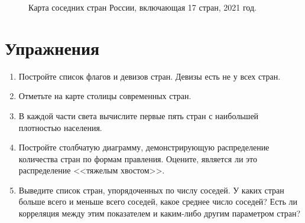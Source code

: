 \begin{figure*}[h]
	{
		\setlength{\fboxsep}{0pt}%
		\setlength{\fboxrule}{1pt}%
	}
    \caption[Карта соседних стран России, 2021 год.]{Карта соседних стран России, включающая 17 стран, 2021 год.}
	\label{fig:neighboring_countries_ru_2020}%
\end{figure*}


\section{Упражнения}

\begin{enumerate}
	\item Постройте список флагов и девизов стран. Девизы есть не у всех стран.
	\item Отметьте на карте столицы современных стран.
	\item В каждой части света вычислите первые пять стран с наибольшей плотностью населения.
	\item Постройте столбчатую диаграмму, демонстрирующую распределение количества стран по формам правления. Оцените, является ли это распределение <<тяжелым хвостом>>\protect\footnotemark.
	\item Выведите список стран, упорядоченных по числу соседей. У каких стран больше всего и меньше всего соседей, какое среднее число соседей? Есть ли корреляция между этим показателем и каким-либо другим параметром стран?
\end{enumerate}


